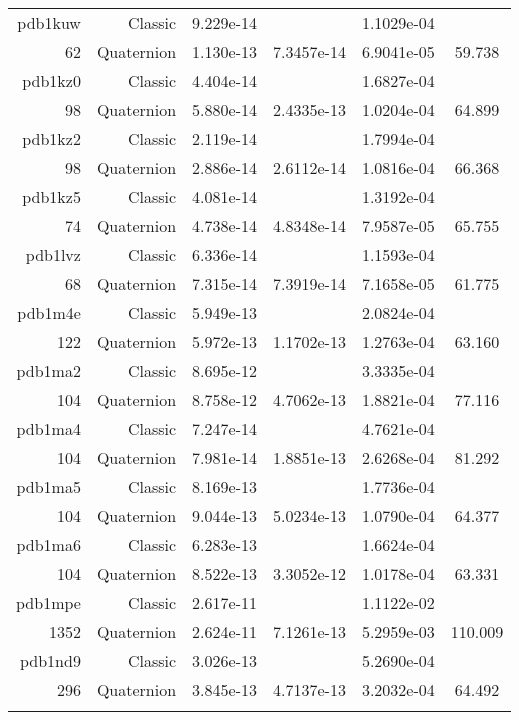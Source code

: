 \begin{xltabular}{\textwidth}{r|rS[table-format=1.3e+2]S[table-format=1.4e+2]S[table-format=1.4e+2]S[table-format=-1.3]}
pdb1kuw & Classic & 9.229e-14 &  & 1.1029e-04 & \\
62 & Quaternion & 1.130e-13 & 7.3457e-14 & 6.9041e-05 & 59.738\\  \addlinespace
pdb1kz0 & Classic & 4.404e-14 &  & 1.6827e-04 & \\
98 & Quaternion & 5.880e-14 & 2.4335e-13 & 1.0204e-04 & 64.899\\  \addlinespace
pdb1kz2 & Classic & 2.119e-14 &  & 1.7994e-04 & \\
98 & Quaternion & 2.886e-14 & 2.6112e-14 & 1.0816e-04 & 66.368\\  \addlinespace
pdb1kz5 & Classic & 4.081e-14 &  & 1.3192e-04 & \\
74 & Quaternion & 4.738e-14 & 4.8348e-14 & 7.9587e-05 & 65.755\\  \addlinespace
pdb1lvz & Classic & 6.336e-14 &  & 1.1593e-04 & \\
68 & Quaternion & 7.315e-14 & 7.3919e-14 & 7.1658e-05 & 61.775\\  \addlinespace
pdb1m4e & Classic & 5.949e-13 &  & 2.0824e-04 & \\
122 & Quaternion & 5.972e-13 & 1.1702e-13 & 1.2763e-04 & 63.160\\  \addlinespace
pdb1ma2 & Classic & 8.695e-12 &  & 3.3335e-04 & \\
104 & Quaternion & 8.758e-12 & 4.7062e-13 & 1.8821e-04 & 77.116\\  \addlinespace
pdb1ma4 & Classic & 7.247e-14 &  & 4.7621e-04 & \\
104 & Quaternion & 7.981e-14 & 1.8851e-13 & 2.6268e-04 & 81.292\\  \addlinespace
pdb1ma5 & Classic & 8.169e-13 &  & 1.7736e-04 & \\
104 & Quaternion & 9.044e-13 & 5.0234e-13 & 1.0790e-04 & 64.377\\  \addlinespace
pdb1ma6 & Classic & 6.283e-13 &  & 1.6624e-04 & \\
104 & Quaternion & 8.522e-13 & 3.3052e-12 & 1.0178e-04 & 63.331\\  \addlinespace
pdb1mpe & Classic & 2.617e-11 &  & 1.1122e-02 & \\
1352 & Quaternion & 2.624e-11 & 7.1261e-13 & 5.2959e-03 & 110.009\\  \addlinespace
pdb1nd9 & Classic & 3.026e-13 &  & 5.2690e-04 & \\
296 & Quaternion & 3.845e-13 & 4.7137e-13 & 3.2032e-04 & 64.492\\  \addlinespace

\end{xltabular}
